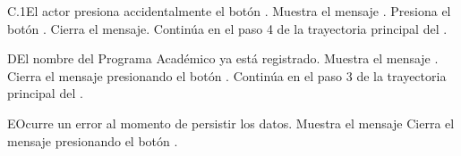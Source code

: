 \begin{UCtrayectoriaA}{C.1}{El actor presiona accidentalmente el botón .}
    \UCpaso Muestra el mensaje .
    \UCpaso[\UCactor] Presiona el botón .
    \UCpaso Cierra el mensaje.
    \UCpaso Continúa en el paso 4 de la trayectoria principal del .
\end{UCtrayectoriaA}


\begin{UCtrayectoriaA}{D}{El nombre del Programa Académico ya está registrado.}
    \UCpaso Muestra el mensaje .
    \UCpaso[\UCactor] Cierra el mensaje presionando el botón .
    \UCpaso Continúa en el paso 3 de la trayectoria principal del .
\end{UCtrayectoriaA}

\begin{UCtrayectoriaA}{E}{Ocurre un error al momento de persistir los datos.}
    \UCpaso Muestra el mensaje 
    \UCpaso[\UCactor] Cierra el mensaje presionando el botón .
\end{UCtrayectoriaA}
